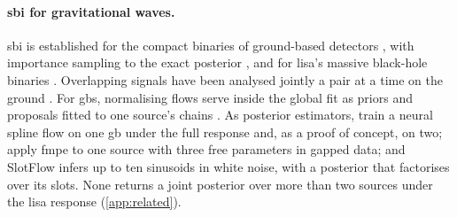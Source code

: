 \paragraph{\Acs{sbi} for gravitational waves.}
\label{sec:background-gw-npe}\label{sec:background-gb}
\Acs{sbi} is established for the compact binaries of ground-based detectors
\citep{green2020gravitational,gabbard2022bayesian,dax2021real,dax2025real}, with importance sampling to
the exact posterior \citep{dax2023neural}, and for \ac{lisa}'s massive black-hole binaries
\citep{du2024advancing,liang2024rapid,spadaro2026accurate}. Overlapping signals have been analysed
jointly a pair at a time on the ground \citep{langendorff2023normalizing,papalini2025can}. For
\acp{gb}, normalising flows serve inside the global fit as priors and proposals fitted to one
source's chains \citep{korsakova2024neural}. As posterior estimators, \citet{delmond2026neural}
train a neural spline flow on one \ac{gb} under the full response and, as a proof of concept, on
two; \citet{mao2025robust} apply \ac{fmpe} to one source with three free parameters in gapped data;
and SlotFlow \citep{houba2025slotflow} infers up to ten sinusoids in white noise, with a posterior
that factorises over its slots. None returns a joint posterior over more than two sources under the
\ac{lisa} response (\cref{app:related}).
